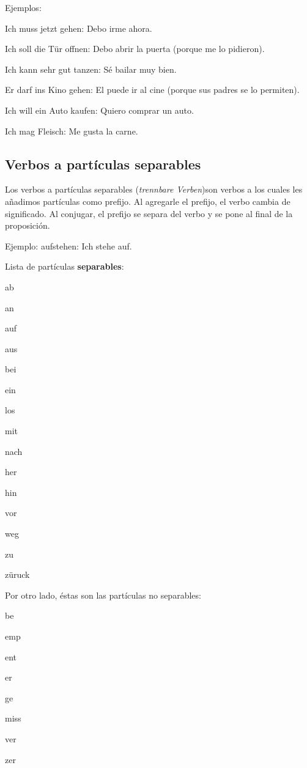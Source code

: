Ejemplos: 
\begin{myitemize}
\item Ich muss jetzt gehen: Debo irme ahora.
\item Ich soll die Tür offnen: Debo abrir la puerta (porque me lo pidieron).
\item Ich kann sehr gut tanzen: Sé bailar muy bien.
\item Er darf ins Kino gehen: El puede ir al cine (porque sus padres se lo permiten).
\item Ich will ein Auto kaufen: Quiero comprar un auto.
\item Ich mag Fleisch: Me gusta la carne.
\end{myitemize}

\subsection{Verbos a partículas separables}
Los verbos a partículas separables (\textit{trennbare Verben})son verbos a los cuales les añadimos partículas como prefijo. Al agregarle el prefijo, el verbo cambia de significado. Al conjugar, el prefijo se separa del verbo y se pone al final de la proposición.

Ejemplo: aufstehen: Ich stehe auf.

Lista de partículas \textbf{separables}:
\begin{multicols}{5}
\begin{myitemize}
\item ab
\item an
\item auf
\item aus
\item bei
\item ein
\item los
\item mit
\item nach
\item her
\item hin
\item vor 
\item weg
\item zu
\item züruck
\end{myitemize}
\end{multicols}

Por otro lado, éstas son las partículas no separables:
\begin{multicols}{5}
\begin{myitemize}
\item be
\item emp
\item ent
\item er
\item ge
\item miss
\item ver
\item zer
\end{myitemize}
\end{multicols}

